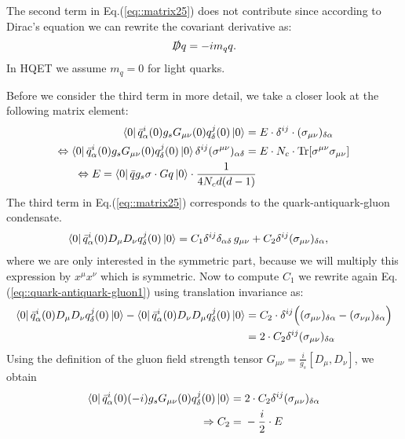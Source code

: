 \documentclass[openright,twoside,12pt,a4paper,final]{article}
\begin{document}
    The second term in Eq.(\ref{eq::matrix25}) does not contribute since according to Dirac's equation we can rewrite the covariant derivative as:
    \begin{align}
        \slashed{D} q = - i m_{q} q.
    \end{align}
    In HQET we assume $m_{q} = 0$ for light quarks.
    
    Before we consider the third term in more detail, we take a closer look at the following matrix element:
    \begin{align}
	    \bra{0} \bar{q}_{\alpha}^i(0)g_s G_{\mu \nu}(0) q_{\delta}^j(0) \ket{0} =& \; E \cdot \delta^{ij} \cdot (\sigma_{\mu \nu})_{\delta \alpha} \nonumber \\ \Leftrightarrow \bra{0} \bar{q}_{\alpha}^i(0)g_s G_{\mu \nu}(0) q_{\delta}^j(0) \ket{0} \delta^{ij} (\sigma^{\mu \nu})_{\alpha \delta} =& \; E \cdot N_c \cdot \mathrm{Tr}[\sigma^{\mu \nu} \sigma_{\mu \nu}] \nonumber \\ \Leftrightarrow E = \bra{0} \bar{q} g_s \sigma \cdot G q \ket{0} \cdot \frac{1}{4 N_c d (d - 1)}
    \end{align}
    The third term in Eq.(\ref{eq::matrix25}) corresponds to the quark-antiquark-gluon condensate.
    \begin{align}
        \bra{0}\bar{q}^{i}_{\alpha}(0) D_{\mu} D_{\nu} q^{j}_{\delta}(0) \ket{0}  &= C_{1} \delta^{ij} \delta_{\alpha \delta} \, g_{\mu \nu} + C_{2}  \delta^{ij} (\sigma_{\mu \nu})_{\delta \alpha},
        \label{eq::quark-antiquark-gluon1}
    \end{align}
    where we are only interested in the symmetric part, because we will multiply this expression by $x^{\mu} x^{\nu}$ which is symmetric. Now to compute $C_{1}$ we rewrite again Eq.(\ref{eq::quark-antiquark-gluon1}) using translation invariance as:
    \begin{align}
        \bra{0}\bar{q}^{i}_{\alpha}(0) D_{\mu} D_{\nu} q^{j}_{\delta}(0) \ket{0}   - \bra{0}\bar{q}^{i}_{\alpha}(0)  D_{\nu} D_{\mu} q^{j}_{\delta}(0) \ket{0}  =& \;  C_{2} \cdot \delta^{ij} \Big((\sigma_{\mu \nu})_{\delta \alpha} - (\sigma_{\nu \mu})_{\delta \alpha} \Big) \nonumber \\ =& \;  2 \cdot C_{2}  \delta^{ij} (\sigma_{\mu \nu})_{\delta \alpha}
    \end{align}
    Using the definition of the gluon field strength tensor $G_{\mu \nu} = \frac{i}{g_s} [D_{\mu},D_{\nu}]$, we obtain
    \begin{align}
	    \bra{0}\bar{q}^{i}_{\alpha}(0) (-i) g_s G_{\mu \nu}(0) q_{\delta}^j(0) \ket{0} =& \;  2 \cdot C_{2}  \delta^{ij} (\sigma_{\mu \nu})_{\delta \alpha} \nonumber \\ \Rightarrow C_2 =& \; -\frac{i}{2} \cdot E
    \end{align}
\end{document}
